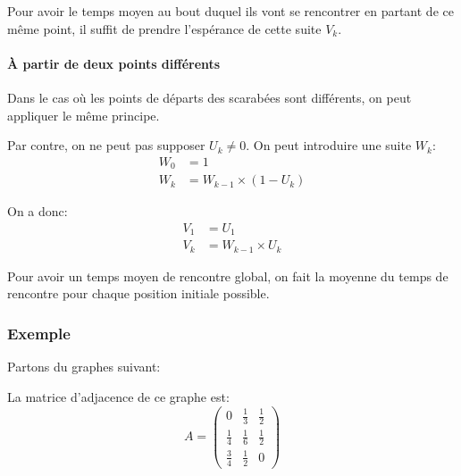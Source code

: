       Pour avoir le temps moyen au bout duquel ils vont se rencontrer en
      partant de ce même point, il suffit de prendre l'espérance de cette suite
      $V_k$. %

    \paragraph{À partir de deux points différents}
      Dans le cas où les points de départs des scarabées sont différents, on peut
      appliquer le même principe.

      Par contre, on ne peut pas supposer $U_k \neq 0$.
      On peut introduire une suite $W_k$:
      \begin{align*}
        W_0 &= 1 \\
        W_k &= W_{k-1} \times (1 - U_k)
      \end{align*}

      On a donc:
      \begin{align*}
        V_1  &= U_1 \\
        V_k &= W_{k-1} \times U_k
      \end{align*}

      Pour avoir un temps moyen de rencontre global, on fait la moyenne du temps
      de rencontre pour chaque position initiale possible. %

  \subsubsection{Exemple}
    Partons du graphes suivant:
    \begin{center}
    \end{center}

    La matrice d'adjacence de ce graphe est:
      \[A = \left(\begin{array}{ccc}
        0 & \frac 1 3 & \frac 1 2 \\
        \frac 1 4 & \frac 1 6 & \frac 1 2 \\
        \frac 3 4 & \frac 1 2 & 0
      \end{array}\right)\]

